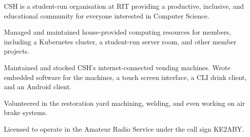 \smallskip


\medskip


\smallskip


\medskip
{}

CSH is a student-run organisation at RIT providing a productive, inclusive, and educational community for everyone interested in Computer Science.

\smallskip

Managed and maintained house-provided computing resources for members, including a Kubernetes cluster, a student-run server room, and other member projects.

\smallskip

Maintained and stocked CSH's internet-connected vending machines.
Wrote embedded software for the machines, a touch screen interface, a CLI drink client, and an Android client.

\divider

Volunteered in the restoration yard machining, welding, and even working on air brake systems.

\divider

Licensed to operate in the Amateur Radio Service under the call sign KE2ABY.
